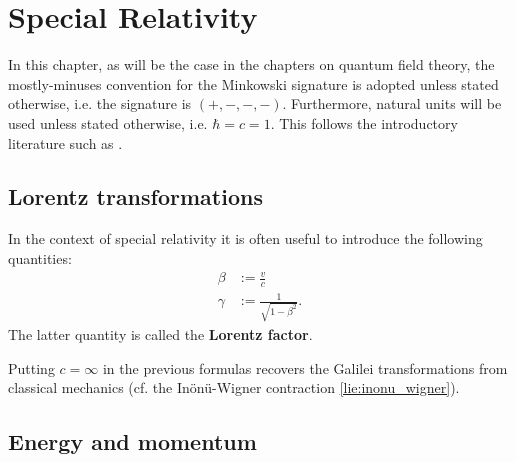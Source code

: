 \chapter{Special Relativity}

    In this chapter, as will be the case in the chapters on quantum field theory, the mostly-minuses convention for the Minkowski signature is adopted unless stated otherwise, i.e. the signature is $(+,-,-,-)$. Furthermore, natural units will be used unless stated otherwise, i.e. $\hbar = c = 1$. This follows the introductory literature such as \cite{Peskin, greiner_qft}.

\section{Lorentz transformations}

    \begin{notation}
        In the context of special relativity it is often useful to introduce the following quantities:
        \begin{align}
            \beta &:= \frac{v}{c}\\
            \label{relativity:lorentz_factor}
            \gamma &:= \frac{1}{\sqrt{1 - \beta^2}}.
        \end{align}
        The latter quantity is called the \textbf{Lorentz factor}.
    \end{notation}
    \begin{remark}
        Putting $c=\infty$ in the previous formulas recovers the Galilei transformations from classical mechanics (cf. the In\"on\"u-Wigner contraction \ref{lie:inonu_wigner}).
    \end{remark}

\section{Energy and momentum}

